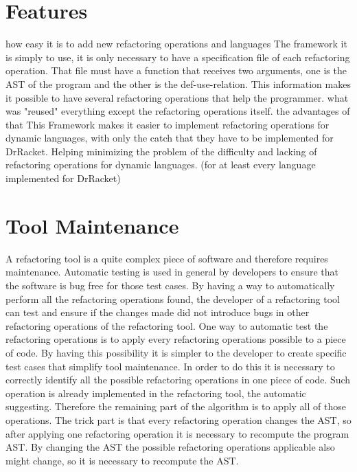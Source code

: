 \section{Features}
how easy it is to add new refactoring operations and languages
The framework it is simply to use, it is only necessary to have a specification file
of each refactoring operation.
That file must have a function that receives two arguments,
one is the AST of the program and the other is the def-use-relation.
This information makes it possible to have several refactoring operations that help
the programmer.
what was "reused"
everything except the refactoring operations itself.
the advantages of that
This Framework makes it easier to implement refactoring operations for dynamic languages,
with only the catch that they have to be implemented for DrRacket. Helping minimizing
the problem of the difficulty and lacking of refactoring operations for dynamic languages.
(for at least every language implemented for DrRacket)
\section{Tool Maintenance} %



A refactoring tool is a quite complex piece of software and therefore requires maintenance.
Automatic testing is used in general by developers to ensure that the software
is bug free for those test cases.
By having a way to automatically perform all the refactoring operations found,
the developer of a refactoring tool can test and ensure if the changes made did not introduce
bugs in other refactoring operations of the refactoring tool.
One way to automatic test the refactoring operations is to apply every refactoring
operations possible to a piece of code. By having this possibility it is simpler
to the developer to create specific test cases that simplify tool maintenance.
In order to do this it is necessary to correctly identify all the possible refactoring
operations in one piece of code. Such operation is already implemented in the refactoring
tool, the automatic suggesting.
Therefore the remaining part of the algorithm is to apply all of those operations.
The trick part is  that every refactoring operation changes the AST, so after
applying one refactoring operation it is necessary to recompute the program AST.
By changing the AST the possible refactoring operations applicable also might change,
so it is necessary to recompute the AST.

